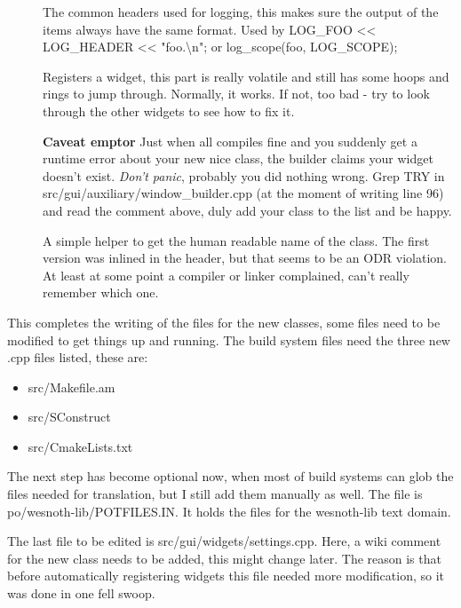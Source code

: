 \begin{description}
\begin{description}
\begin{description}
	\item[]
		The common headers used for logging, this makes sure the output of the
		items always have the same format. Used by
		LOG\_FOO \textless\textless{} LOG\_HEADER \textless\textless{} "foo.\textbackslash{}n"; or
		log\_scope(foo, LOG\_SCOPE); %

	\item[]
		Registers a widget, this part is really volatile and still has some
		hoops and rings to jump through. Normally, it works. If not, too bad -
		try to look through the other widgets to see how to fix it. 

		\textbf{Caveat emptor} Just when all compiles fine and you suddenly get a runtime
		error about your new nice class, the builder claims your widget doesn't
		exist. \emph{Don't panic}, probably you did nothing wrong. Grep TRY in
		src/gui/auxiliary/window\_builder.cpp (at the moment of writing line 96)
		and read the comment above, duly add your class to the list and be
		happy.

	\item[]
		A simple helper to get the human readable name of the class. The first
		version was inlined in the header, but that seems to be an ODR
		violation. At least at some point a compiler or linker complained, can't
		really remember which one. %

	\end{description}
\end{description}

This completes the writing of the files for the new classes, some files need to
be modified to get things up and running. The build system files need the three
new .cpp files listed, these are:
\begin{itemize}
\item src/Makefile.am
\item src/SConstruct
\item src/CmakeLists.txt
\end{itemize}

The next step has become optional now, when most of build systems can glob the files
needed for translation, but I still add them manually as well. The file is 
po/wesnoth-lib/POTFILES.IN. It holds the files for the wesnoth-lib text
domain.

The last file to be edited is src/gui/widgets/settings.cpp. Here, a wiki comment
for the new class needs to be added, this might change later. The reason is that
before automatically registering widgets this file needed more modification, so
it was done in one fell swoop.

\end{description}

